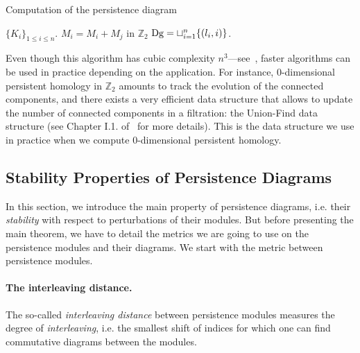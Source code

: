 \begin{algorithm}
\caption{\label{alg:pers}  Computation of the persistence diagram}
\begin{algorithmic}
 $\{K_{i}\}_{1\leq i\leq n}$.
		\STATE $M_{i}=M_{i}+M_{j}$ in $\mathbb{Z}_2$
	\ENDWHILE
\ENDFOR
{} $\mathrm{Dg}=\sqcup_{i=1}^n\{(l_i,i)\}$.
\end{algorithmic}
\end{algorithm}  

Even though this algorithm has cubic complexity $n^{3}$---see~\cite{Morozov08}, 
faster algorithms can be used in practice depending on the application. 
For instance, 0-dimensional persistent homology in $\mathbb{Z}_{2}$ amounts to track the 
evolution of the connected components, and there exists a very efficient data 
structure that allows to update the number of connected components in a filtration: 
the Union-Find data structure (see Chapter I.1. of~\cite{Edelsbrunner10} for more details). 
This is the data structure we use in practice when we compute 0-dimensional persistent homology.


\subsection{Stability Properties of Persistence Diagrams}\label{sec:stabilityPD}

In this section, we introduce the main property of persistence diagrams, i.e. their {\em stability}
with respect to perturbations of their modules. 
But before presenting the main theorem, we have to detail the metrics we 
are going to use on the persistence modules and their diagrams. 
We start with the metric between persistence modules.

\paragraph*{The interleaving distance.} The so-called {\em interleaving distance}
between persistence modules measures the degree of {\em interleaving}, i.e. the smallest
shift of indices for which one can find commutative diagrams between the modules. 

